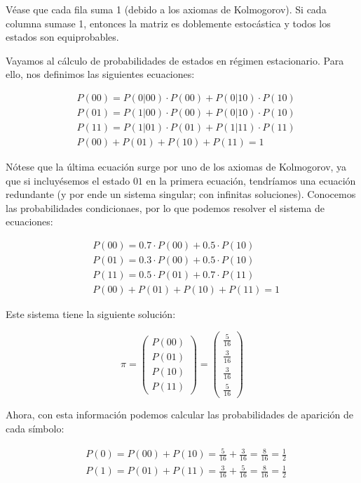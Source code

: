 Véase que cada fila suma 1 (debido a los axiomas de Kolmogorov). Si cada
columna sumase 1, entonces la matriz es doblemente estocástica y todos
los estados son equiprobables.

Vayamos al cálculo de probabilidades de estados en régimen estacionario.
Para ello, nos definimos las siguientes ecuaciones:


\begin{align*}
&P(00) = P(0|00)\cdot P(00) + P(0|10)\cdot P(10)\\
&P(01) = P(1|00)\cdot P(00) + P(0|10)\cdot P(10)\\
&P(11) = P(1|01)\cdot P(01) + P(1|11)\cdot P(11)\\
&P(00) + P(01) + P(10) + P(11) = 1
\end{align*}


Nótese que la última ecuación surge por uno de los axiomas de
Kolmogorov, ya que si incluyésemos el estado \(01\) en la primera
ecuación, tendríamos una ecuación redundante (y por ende un sistema
singular; con infinitas soluciones). Conocemos las probabilidades
condicionaes, por lo que podemos resolver el sistema de ecuaciones:


\begin{align*}
&P(00) = 0.7\cdot P(00) + 0.5\cdot P(10)\\
&P(01) = 0.3\cdot P(00) + 0.5\cdot P(10)\\
&P(11) = 0.5\cdot P(01) + 0.7\cdot P(11)\\
&P(00) + P(01) + P(10) + P(11) = 1
\end{align*}


Este sistema tiene la siguiente solución:

\[
\pi = \begin{pmatrix} P(00) \\ P(01) \\ P(10) \\ P(11) \end{pmatrix} = \begin{pmatrix} \frac{5}{16} \\ \frac{3}{16} \\ \frac{3}{16} \\ \frac{5}{16} \end{pmatrix}
\]

Ahora, con esta información podemos calcular las probabilidades de
aparición de cada símbolo:


\begin{align*}
&P(0) = P(00) + P(10) = \frac{5}{16} + \frac{3}{16} = \frac{8}{16} = \frac{1}{2}\\
&P(1) = P(01) + P(11) = \frac{3}{16} + \frac{5}{16} = \frac{8}{16} = \frac{1}{2}
\end{align*}


